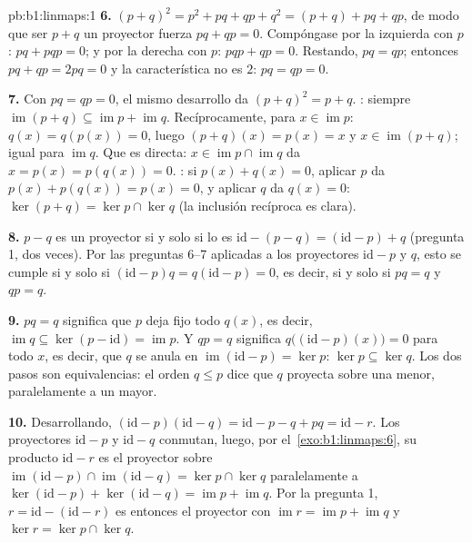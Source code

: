 \begin{solution}{pb:b1:linmaps:1}
\textbf{6.} $(p + q)^2 = p^2 + pq + qp + q^2 = (p + q) + pq + qp$,
de modo que ser $p + q$ un proyector fuerza $pq + qp = 0$.
Compóngase por la izquierda con $p$: $pq + pqp = 0$; y por la
derecha con $p$: $pqp + qp = 0$. Restando, $pq = qp$; entonces
$pq + qp = 2pq = 0$ y la característica no es $2$: $pq = qp = 0$.

\textbf{7.} Con $pq = qp = 0$, el mismo desarrollo da
$(p + q)^2 = p + q$. : siempre
$\operatorname{im}(p + q) \subseteq \operatorname{im} p +
\operatorname{im} q$. Recíprocamente, para $x \in \operatorname{im}
p$: $q(x) = q(p(x)) = 0$, luego $(p + q)(x) = p(x) = x$ y
$x \in \operatorname{im}(p+q)$; igual para $\operatorname{im} q$.
Que es directa: $x \in \operatorname{im} p \cap \operatorname{im} q$
da $x = p(x) = p(q(x)) = 0$. : si $p(x) + q(x) = 0$,
aplicar $p$ da $p(x) + p(q(x)) = p(x) = 0$, y aplicar $q$ da
$q(x) = 0$: $\ker(p + q) = \ker p \cap \ker q$ (la inclusión
recíproca es clara).

\textbf{8.} $p - q$ es un proyector si y solo si lo es
$\mathrm{id} - (p - q) = (\mathrm{id} - p) + q$ (pregunta 1, dos
veces). Por las preguntas 6--7 aplicadas a los proyectores
$\mathrm{id} - p$ y $q$, esto se cumple si y solo si
$(\mathrm{id} - p)q = q(\mathrm{id} - p) = 0$, es decir, si y solo
si $pq = q$ y $qp = q$.

\textbf{9.} $pq = q$ significa que $p$ deja fijo todo $q(x)$, es
decir, $\operatorname{im} q \subseteq \ker(p - \mathrm{id}) =
\operatorname{im} p$. Y $qp = q$ significa
$q\bigl((\mathrm{id} - p)(x)\bigr) = 0$ para todo $x$, es decir, que
$q$ se anula en $\operatorname{im}(\mathrm{id} - p) = \ker p$:
$\ker p \subseteq \ker q$. Los dos pasos son equivalencias: el orden
$q \leq p$ dice que $q$ proyecta sobre una  menor,
paralelamente a un  mayor.

\textbf{10.} Desarrollando,
$(\mathrm{id} - p)(\mathrm{id} - q) = \mathrm{id} - p - q + pq =
\mathrm{id} - r$. Los proyectores $\mathrm{id} - p$ y
$\mathrm{id} - q$ conmutan, luego, por el~\cref{exo:b1:linmaps:6},
su producto $\mathrm{id} - r$ es el proyector sobre
$\operatorname{im}(\mathrm{id} - p) \cap
\operatorname{im}(\mathrm{id} - q) = \ker p \cap \ker q$
paralelamente a $\ker(\mathrm{id} - p) + \ker(\mathrm{id} - q) =
\operatorname{im} p + \operatorname{im} q$. Por la pregunta 1,
$r = \mathrm{id} - (\mathrm{id} - r)$ es entonces el proyector con
$\operatorname{im} r = \operatorname{im} p + \operatorname{im} q$ y
$\ker r = \ker p \cap \ker q$.


\end{solution}
